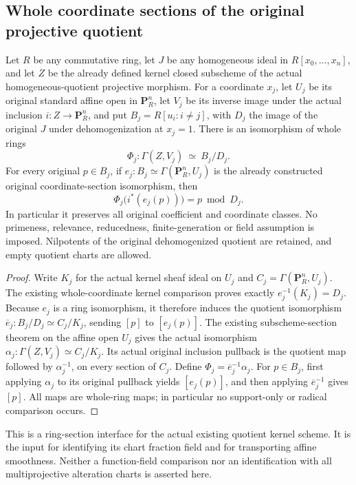 \subsection{Whole coordinate sections of the original projective quotient}

\begin{lemma}\label{lem:original-native-quotient-coordinate-sections}
\leanok
Let $R$ be any commutative ring, let $J$ be any homogeneous ideal in
$R[x_0,\ldots,x_n]$, and let $Z$ be the already defined kernel closed
subscheme of the actual homogeneous-quotient projective morphism.
For a coordinate $x_j$, let $U_j$ be its original standard affine open in
$\mathbf P^n_R$, let $V_j$ be its inverse image under the actual inclusion
$i:Z\to\mathbf P^n_R$, and put
$B_j=R[u_i:i\ne j]$, with $D_j$ the image of the original $J$ under
dehomogenization at $x_j=1$. There is an isomorphism of whole rings
\[
  \Phi_j:\Gamma(Z,V_j)\ \simeq\ B_j/D_j.
\]
For every original $p\in B_j$, if $e_j:B_j\simeq\Gamma(\mathbf P^n_R,U_j)$
is the already constructed original coordinate-section isomorphism, then
\[
 \Phi_j\big(i^*(e_j(p))\big)=p\bmod D_j.
\]
In particular it preserves all original coefficient and coordinate classes.
No primeness, relevance, reducedness, finite-generation or field assumption
is imposed. Nilpotents of the original dehomogenized quotient are retained,
and empty quotient charts are allowed.
\end{lemma}
\begin{proof}
Write $K_j$ for the actual kernel sheaf ideal on $U_j$ and
$C_j=\Gamma(\mathbf P^n_R,U_j)$. The existing whole-coordinate kernel
comparison proves exactly $e_j^{-1}(K_j)=D_j$. Because $e_j$ is a ring
isomorphism, it therefore induces the quotient isomorphism
$\overline e_j:B_j/D_j\simeq C_j/K_j$, sending $[p]$ to $[e_j(p)]$.
The existing subscheme-section theorem on the affine open $U_j$ gives the
actual isomorphism
$\alpha_j:\Gamma(Z,V_j)\simeq C_j/K_j$. Its actual original inclusion
pullback is the quotient map followed by $\alpha_j^{-1}$, on every section
of $C_j$. Define $\Phi_j=\overline e_j^{-1}\alpha_j$.
For $p\in B_j$, first applying $\alpha_j$ to its original pullback yields
$[e_j(p)]$, and then applying $\overline e_j^{-1}$ gives $[p]$.
All maps are whole-ring maps; in particular no support-only or radical
comparison occurs.
\end{proof}

\begin{remark}\label{rmk:original-native-quotient-sections-scope}
This is a ring-section interface for the actual existing quotient kernel
scheme. It is the input for identifying its chart fraction field and for
transporting affine smoothness. Neither a function-field comparison nor an
identification with all multiprojective alteration charts is asserted here.
\end{remark}
